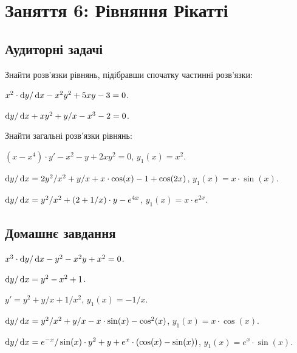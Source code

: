 \section*{Заняття 6: Рівняння Рікатті}

\subsection*{Аудиторні задачі}

Знайти розв'язки рівнянь, підібравши спочатку частинні розв'язки:

\begin{problem}
	$x^2 \cdot \mathop{}\!\mathrm{d} y / \mathop{}\!\mathrm{d} x - x^2 y^2 + 5 x y - 3 = 0$.
\end{problem}

\begin{problem}
	$\mathop{}\!\mathrm{d} y / \mathop{}\!\mathrm{d} x + x y^2 + y / x - x^3 - 2 = 0$.
\end{problem}

Знайти загальні розв'язки рівнянь:

\begin{problem}
	$(x - x^4) \cdot y' - x^2 - y + 2 x y^2 = 0$, $y_1(x) = x^2$.
\end{problem}

\begin{problem}
	$\mathop{}\!\mathrm{d} y / \mathop{}\!\mathrm{d} x = 2 y^2 / x^2 + y / x + x \cdot \cos (x) - 1 + \cos (2 x)$, $y_1(x) = x \cdot \sin (x)$.
\end{problem}

\begin{problem}
	$\mathop{}\!\mathrm{d} y / \mathop{}\!\mathrm{d} x = y^2 / x^2 + (2 + 1 / x) \cdot y - e^{4x}$, $y_1(x) = x \cdot e^{2 x}$.
\end{problem}

\subsection*{Домашнє завдання}

\begin{problem}
	$x^3 \cdot \mathop{}\!\mathrm{d} y / \mathop{}\!\mathrm{d} x - y^2 - x^2 y + x^2 = 0$.
\end{problem}

\begin{problem}
	$\mathop{}\!\mathrm{d} y / \mathop{}\!\mathrm{d} x = y^2 - x^2 + 1$.
\end{problem}

\begin{problem}
	$y' = y^2 + y / x + 1 / x^2$, $y_1(x) = - 1 / x$.
\end{problem}

\begin{problem}
	$\mathop{}\!\mathrm{d} y / \mathop{}\!\mathrm{d} x = y^2 / x^2 + y / x - x \cdot \sin (x) - \cos^2 (x)$, $y_1(x) = x \cdot \cos (x)$.
\end{problem}

\begin{problem}
	$\mathop{}\!\mathrm{d} y / \mathop{}\!\mathrm{d} x = e^{-x} / \sin (x) \cdot y^2 + y + e^x \cdot (\cos (x) - \sin (x))$, $y_1(x) = e^x \cdot \sin (x)$.
\end{problem}
